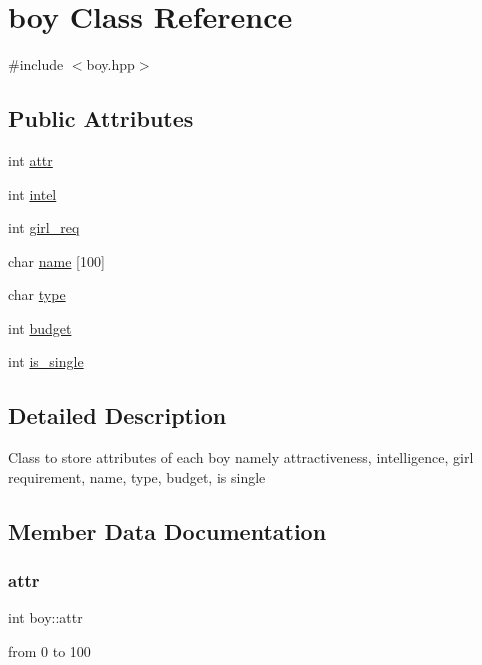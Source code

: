 \hypertarget{classboy}{}\section{boy Class Reference}
\label{classboy}


{\ttfamily \#include $<$boy.\+hpp$>$}

\subsection*{Public Attributes}
\begin{DoxyCompactItemize}
\item 
int \hyperlink{classboy_a1f5bd5201d830f7398b33f5330ab18d1}{attr}
\item 
int \hyperlink{classboy_a71d1abd867065c974a0a5fc82816251e}{intel}
\item 
int \hyperlink{classboy_a4010ffd0cd277dc18b46dfc02deb5373}{girl\+\_\+req}
\item 
char \hyperlink{classboy_a703fa58417037fd55aaa45942fb550a5}{name} \mbox{[}100\mbox{]}
\item 
char \hyperlink{classboy_a306008ea0ed9d913e5479fd7e6029291}{type}
\item 
int \hyperlink{classboy_a80d6bd6642a612cf0428ab56a2098316}{budget}
\item 
int \hyperlink{classboy_a41970db5115b231d0c631b072319e44d}{is\+\_\+single}
\end{DoxyCompactItemize}


\subsection{Detailed Description}
Class to store attributes of each boy namely attractiveness, intelligence, girl requirement, name, type, budget, is single 

\subsection{Member Data Documentation}
\mbox{\label{classboy_a1f5bd5201d830f7398b33f5330ab18d1}} 
\subsubsection{\texorpdfstring{attr}{attr}}
{\footnotesize\ttfamily int boy\+::attr}

from 0 to 100 \mbox{\label{classboy_a80d6bd6642a612cf0428ab56a2098316}} 
